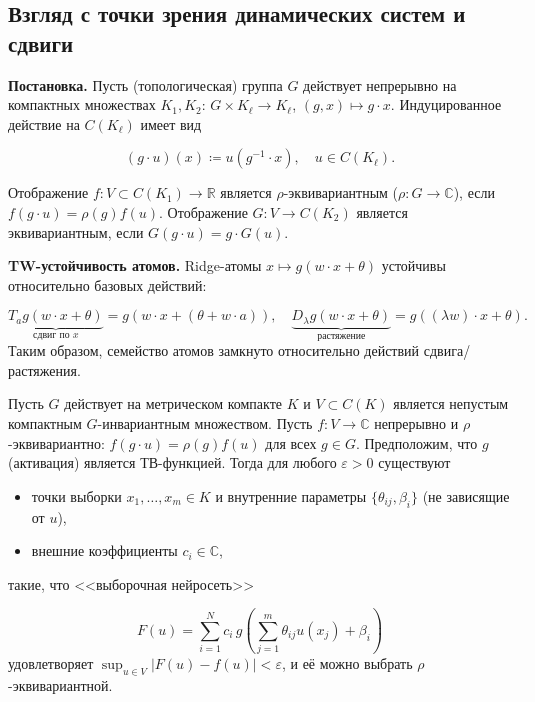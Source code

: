 \documentclass[../NDCNNAI_main.tex]{subfiles}
\begin{document}


\subsection{Взгляд с точки зрения динамических систем и сдвиги}

\textbf{Постановка.} Пусть (топологическая) группа \( G \) действует непрерывно на компактных множествах \( K_1, K_2 \): \( G \times K_\ell \to K_\ell \), \((g, x) \mapsto g \cdot x\). Индуцированное действие на \( C(K_\ell) \) имеет вид

\[
(g \cdot u)(x) \coloneq  u(g^{-1} \cdot x), \quad u \in C(K_\ell).
\]

Отображение \( f \colon V \subset C(K_1) \to \mathbb{R} \) является \( \rho \)-эквивариантным (\( \rho \colon G \to \mathbb{C}\)), если \( f(g \cdot u) = \rho(g)f(u) \).  
Отображение \( G \colon V \to C(K_2) \) является эквивариантным, если \( G(g \cdot u) = g \cdot G(u) \).

\textbf{TW-устойчивость атомов.} Ridge-атомы \( x \mapsto g(w \cdot x + \theta) \) устойчивы относительно базовых действий:

\[
\underbrace{T_{a} g(w \cdot x + \theta)}_{\text{сдвиг по } x} = g(w \cdot x + (\theta + w \cdot a)),
\quad
\underbrace{D_{\lambda} g(w \cdot x + \theta)}_{\text{растяжение}} = g((\lambda w) \cdot x + \theta).
\]
Таким образом, семейство атомов замкнуто относительно действий сдвига/растяжения.


\begin{theorem}

Пусть \( G \) действует на метрическом компакте \( K \) и \( V \subset C(K) \) является непустым компактным \( G \)-инвариантным множеством.  
Пусть \( f \colon V \to \mathbb{C} \) непрерывно и \( \rho \)-эквивариантно: \( f(g \cdot u) = \rho(g)f(u) \) для всех \( g \in G \).  
Предположим, что \( g \) (активация) является ТВ-функцией. Тогда для любого \( \varepsilon > 0 \) существуют

\begin{itemize}
    \item точки выборки \( x_1, \ldots, x_m \in K \) и внутренние параметры \( \{\theta_{ij}, \beta_i\} \) (не зависящие от \( u \)),
\item внешние коэффициенты \( c_i \in \mathbb{C} \),
\end{itemize}
такие, что <<выборочная нейросеть>>

\[
F(u) = \sum_{i=1}^{N} c_i \, g \left( \sum_{j=1}^{m} \theta_{ij} u(x_j) + \beta_i \right)
\]
удовлетворяет $\sup_{u \in V} |F(u) - f(u)| < \varepsilon$, и её можно выбрать \( \rho \)-эквивариантной.
\end{theorem}
\end{document}
